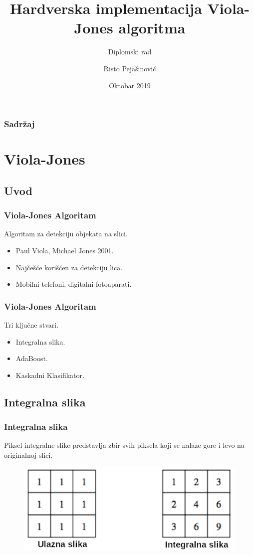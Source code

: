 \documentclass{beamer}
\title[] %
{Hardverska implementacija Viola-Jones algoritma}
\subtitle{Diplomski rad}
\author[Risto Pejašinović]
{Risto Pejašinović}
\institute[FTN] %
{
  Fakultet Tehničkih Nauka,
  Univerzitet u Novom Sadu
}
\date[Oktobar 2019] %
{Oktobar 2019}
\begin{document}
\frame{\titlepage}

\begin{frame}
  \frametitle{Sadržaj}
  \tableofcontents
\end{frame}

\section{Viola-Jones}

\subsection{Uvod}
\begin{frame}
  \frametitle{Viola-Jones Algoritam}
  Algoritam za detekciju objekata na slici.
  \begin{itemize}
  \item Paul Viola, Michael Jones 2001.
  \item<1-> Najčešće korišćen za detekciju lica.
  \item<1-> Mobilni telefoni, digitalni fotoaparati.
  \end{itemize}
\end{frame}

\begin{frame}
  \frametitle{Viola-Jones Algoritam}
  Tri ključne stvari.
  \begin{itemize}
  \item<1-> Integralna slika.
  \item<1-> AdaBoost.
  \item<1-> Kaskadni Klasifikator.
  \end{itemize}
\end{frame}

\subsection{Integralna slika}

\begin{frame}
  \frametitle{Integralna slika}
  Piksel integralne slike predstavlja zbir svih piksela koji se nalaze gore i levo
  na originalnoj slici.
  \begin{figure}[H]
    \centering
    \includegraphics[width=0.55\linewidth]{../images/integral_image1}
  \end{figure}
\end{frame}
\end{document}
